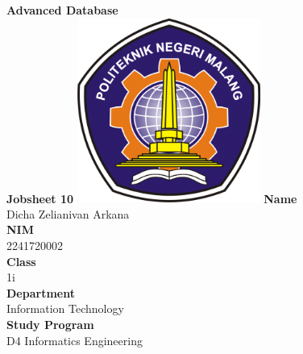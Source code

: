 \documentclass[12pt,titlepage]{article}
\newcommand{\vSubject}{Advanced Database}
\newcommand{\vSubtitle}{Jobsheet 10}
\newcommand{\vName}{Dicha Zelianivan Arkana}
\newcommand{\vNIM}{2241720002}
\newcommand{\vClass}{1i}
\newcommand{\vDepartment}{Information Technology}
\newcommand{\vStudyProgram}{D4 Informatics Engineering}
\begin{document}
\begin{titlepage}
    \centering
    \vfill
    {\bfseries\LARGE
        \vSubject\\
        \vskip0.25cm
        \vSubtitle
    }
    \vfill
    \includegraphics[width=6cm]{images/polinema-logo.png}
    \vfill
    {
        \textbf{Name}\\
        \vName\\
        \vskip0.5cm
        \textbf{NIM}\\
        \vNIM\\
        \vskip0.5cm
        \textbf{Class}\\
        \vClass\\
        \vskip0.5cm
        \textbf{Department}\\
        \vDepartment\\
        \vskip0.5cm
        \textbf{Study Program}\\
        \vStudyProgram
    }
\end{titlepage}
\end{document}
